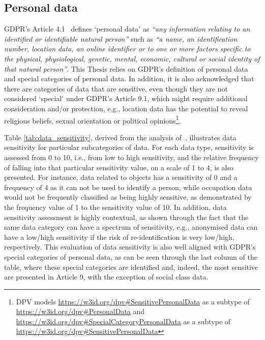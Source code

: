 \subsection{Personal data}
\label{sec:def_personal_data}

GDPR's Article 4.1~\citeyearpar{noauthor_regulation_2016} defines `personal data' as \textit{``any information relating to an identified or identifiable natural person''} such as \textit{``a name, an identification number, location data, an online identifier or to one or more factors specific to the physical, physiological, genetic, mental, economic, cultural or social identity of that natural person''}.
This Thesis relies on GDPR's definition of personal data and special categories of personal data.
In addition, it is also acknowledged that there are categories of data that are sensitive, even though they are not considered `special' under GDPR's Article 9.1, which might require additional consideration and/or protection, e.g., location data has the potential to reveal religious beliefs, sexual orientation or political opinions\footnote{DPV models \url{https://w3id.org/dpv\#SensitivePersonalData} as a subtype of \url{https://w3id.org/dpv\#PersonalData} and \url{https://w3id.org/dpv\#SpecialCategoryPersonalData} as a subtype of \url{https://w3id.org/dpv\#SensitivePersonalData}}.

Table \ref{tab:data_sensitivity}, derived from the analysis of~\cite{rumbold_what_2018}, illustrates data sensitivity for particular subcategories of data. For each data type, sensitivity is assessed from 0 to 10, i.e., from low to high sensitivity, and the relative frequency of falling into that particular sensitivity value, on a scale of 1 to 4, is also presented. For instance, data related to objects has a sensitivity of 0 and a frequency of 4 as it can not be used to identify a person, while occupation data would not be frequently classified as being highly sensitive, as demonstrated by the frequency value of 1 to the sensitivity value of 10.
In addition, data sensitivity assessment is highly contextual, as shown through the fact that the same data category can have a spectrum of sensitivity, e.g., anonymised data can have a low/high sensitivity if the risk of re-identification is very low/high, respectively. 
This evaluation of data sensitivity is also well aligned with GDPR's special categories of personal data, as can be seen through the last column of the table, where these special categories are identified and, indeed, the most sensitive are presented in Article 9, with the exception of social class data.

